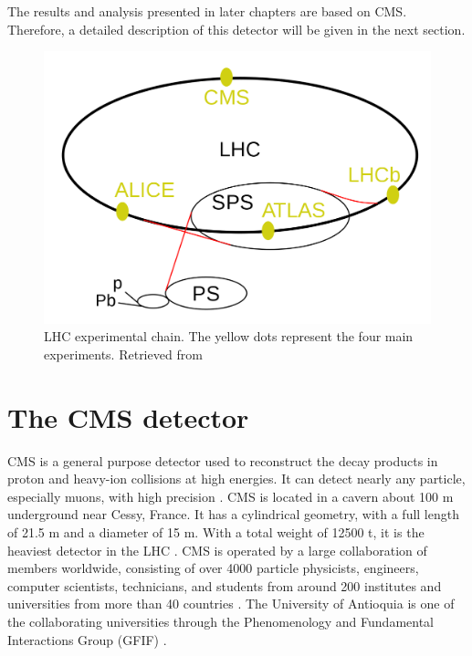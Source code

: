 The results and analysis presented in later chapters are based on CMS. Therefore, a detailed description of this detector will be given in the next section.

\begin{figure}[htp!]
	\centering
	\includegraphics[scale=0.3]{MainContent/Figs/LHC.png}
	\caption{LHC experimental chain. The yellow dots represent the four main experiments. Retrieved from \cite{nobrega2013lhc}}
	\label{fig:LHC}
\end{figure}

\section{The CMS detector}

CMS is a general purpose detector used to reconstruct the decay products in proton and heavy-ion collisions at high energies. It can detect nearly any particle, especially muons, with high precision . CMS is located in a cavern about 100 m underground near Cessy, France. It has a cylindrical geometry, with a full length of 21.5 m and a diameter of 15 m. With a total weight of 12500 t, it is the heaviest detector in the LHC \cite{bragagnolo2021measurement, mejia2012medida}. CMS is operated by a large collaboration of members worldwide, consisting of over 4000 particle physicists, engineers, computer scientists, technicians, and students from around 200 institutes and universities from more than 40 countries \cite{cms_collab}. The University of Antioquia is one of the collaborating universities through the Phenomenology and Fundamental Interactions Group (GFIF) \cite{restrepo2019udea}.

